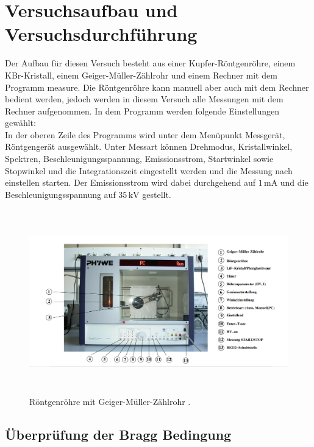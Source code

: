\section{Versuchsaufbau und Versuchsdurchführung}

\begin{flushleft}
    Der Aufbau für diesen Versuch besteht aus einer Kupfer-Röntgenröhre, einem KBr-Kristall, einem Geiger-Müller-Zählrohr und einem Rechner mit dem Programm measure.
    Die Röntgenröhre kann manuell aber auch mit dem Rechner bedient werden, jedoch werden in diesem Versuch alle Messungen mit dem Rechner aufgenommen.
    In dem Programm werden folgende Einstellungen gewählt: \\
    In der oberen Zeile des Programms wird unter dem Menüpunkt Messgerät, Röntgengerät ausgewählt. 
    Unter Messart können Drehmodus, Kristallwinkel, Spektren, Beschleunigungsspannung, Emissionsstrom, Startwinkel sowie Stopwinkel und die Integrationszeit eingestellt werden und die Messung nach einstellen starten.
    Der Emissionsstrom wird dabei durchgehend auf $1\,\unit{\milli\ampere}$ und die Beschleunigungsspannung auf $35\,\unit{\kilo\volt}$ gestellt. 
\end{flushleft}

\begin{figure}[H]
    \centering
    \includegraphics[height=80mm]{bilder/Röntgenröhre.png}
    \caption{Röntgenröhre mit Geiger-Müller-Zählrohr \cite{a1}. \label{Abbildung2} }
\end{figure}

\subsection{Überprüfung der Bragg Bedingung}

